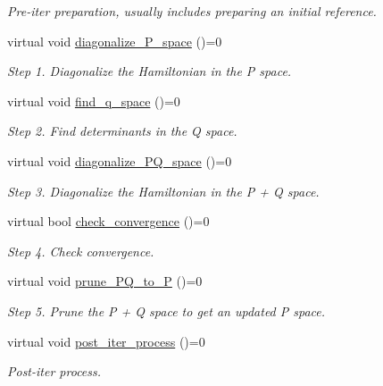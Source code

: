 \begin{DoxyCompactItemize}
\begin{DoxyCompactList}\small\item\em Pre-\/iter preparation, usually includes preparing an initial reference. \end{DoxyCompactList}\item 
virtual void \mbox{\hyperlink{classforte_1_1_selected_c_i_method_a7b2b41da889659f03361f625c6df44d2}{diagonalize\+\_\+\+P\+\_\+space}} ()=0
\begin{DoxyCompactList}\small\item\em Step 1. Diagonalize the Hamiltonian in the P space. \end{DoxyCompactList}\item 
virtual void \mbox{\hyperlink{classforte_1_1_selected_c_i_method_aff521efa08edfafb479f32e03a70c118}{find\+\_\+q\+\_\+space}} ()=0
\begin{DoxyCompactList}\small\item\em Step 2. Find determinants in the Q space. \end{DoxyCompactList}\item 
virtual void \mbox{\hyperlink{classforte_1_1_selected_c_i_method_a9f01588d22401cd2631a09940ea7db50}{diagonalize\+\_\+\+P\+Q\+\_\+space}} ()=0
\begin{DoxyCompactList}\small\item\em Step 3. Diagonalize the Hamiltonian in the P + Q space. \end{DoxyCompactList}\item 
virtual bool \mbox{\hyperlink{classforte_1_1_selected_c_i_method_acc10aa488c79c2abec46a9093ecf5a52}{check\+\_\+convergence}} ()=0
\begin{DoxyCompactList}\small\item\em Step 4. Check convergence. \end{DoxyCompactList}\item 
virtual void \mbox{\hyperlink{classforte_1_1_selected_c_i_method_a245f5fcd64ee44acf7b065981380f8dd}{prune\+\_\+\+P\+Q\+\_\+to\+\_\+P}} ()=0
\begin{DoxyCompactList}\small\item\em Step 5. Prune the P + Q space to get an updated P space. \end{DoxyCompactList}\item 
virtual void \mbox{\hyperlink{classforte_1_1_selected_c_i_method_a23ea3389ac1c62dee811decc5bea507f}{post\+\_\+iter\+\_\+process}} ()=0
\begin{DoxyCompactList}\small\item\em Post-\/iter process. \end{DoxyCompactList}\item 

\end{DoxyCompactItemize}
